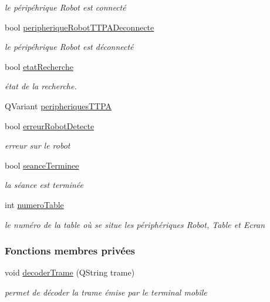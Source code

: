 \begin{DoxyCompactItemize}
\begin{DoxyCompactList}\small\item\em le péripéhrique Robot est connecté \end{DoxyCompactList}\item 
bool \hyperlink{class_communication_bluetooth_aaebda45ba1821d9b15ed957926954ddc}{peripherique\+Robot\+T\+T\+P\+A\+Deconnecte}
\begin{DoxyCompactList}\small\item\em le péripéhrique Robot est déconnecté \end{DoxyCompactList}\item 
bool \hyperlink{class_communication_bluetooth_a9e252653d4d3c6fa9c772b35bf0eb02f}{etat\+Recherche}
\begin{DoxyCompactList}\small\item\em état de la recherche. \end{DoxyCompactList}\item 
Q\+Variant \hyperlink{class_communication_bluetooth_a656a80f8216d2a4db7cf2f865365e562}{peripheriques\+T\+T\+PA}
\item 
bool \hyperlink{class_communication_bluetooth_a0ceb51c44da6c7479b46ae8e737e1541}{erreur\+Robot\+Detecte}
\begin{DoxyCompactList}\small\item\em erreur sur le robot \end{DoxyCompactList}\item 
bool \hyperlink{class_communication_bluetooth_a80ddad176c95b72e083c32b39b4454cc}{seance\+Terminee}
\begin{DoxyCompactList}\small\item\em la séance est terminée \end{DoxyCompactList}\item 
int \hyperlink{class_communication_bluetooth_a9428f8261f0cc055e9c6fed9a61cb595}{numero\+Table}
\begin{DoxyCompactList}\small\item\em le numéro de la table où se situe les périphériques Robot, Table et Ecran \end{DoxyCompactList}\end{DoxyCompactItemize}
\subsubsection*{Fonctions membres privées}
\begin{DoxyCompactItemize}
\item 
void \hyperlink{class_communication_bluetooth_a6b53f12131d9323cec8f2a03fe716e6a}{decoder\+Trame} (Q\+String trame)
\begin{DoxyCompactList}\small\item\em permet de décoder la trame émise par le terminal mobile \end{DoxyCompactList}\end{DoxyCompactItemize}
